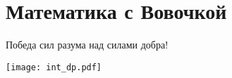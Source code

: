 \section{Математика с Вовочкой} %
\begin{epigraph}
    Победа сил разума над силами добра!
\end{epigraph}
\begin{center}
      \texttt{[image: int\_dp.pdf]}
\end{center}
